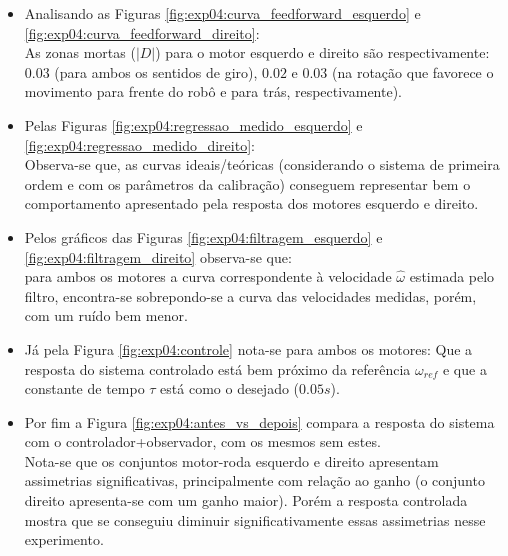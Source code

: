 \begin{itemize}
    \item Analisando as Figuras \ref{fig:exp04:curva_feedforward_esquerdo} e \ref{fig:exp04:curva_feedforward_direito}:\\
        As zonas mortas ($|D|$) para o motor esquerdo e direito são respectivamente: $0.03$ (para ambos os sentidos de giro), $0.02$ e $0.03$ (na rotação que favorece o movimento para frente do robô e para trás, respectivamente).
    \item Pelas Figuras \ref{fig:exp04:regressao_medido_esquerdo} e \ref{fig:exp04:regressao_medido_direito}:\\
        Observa-se que, as curvas ideais/teóricas (considerando o sistema de primeira ordem e com os parâmetros da calibração) conseguem representar bem o comportamento apresentado pela resposta dos motores esquerdo e direito.
    \item Pelos gráficos das Figuras \ref{fig:exp04:filtragem_esquerdo} e \ref{fig:exp04:filtragem_direito} observa-se que:\\
        para ambos os motores a curva correspondente à velocidade $\hat{\omega}$ estimada pelo filtro, encontra-se sobrepondo-se a curva das velocidades medidas, porém, com um ruído bem menor.
    \item Já pela Figura \ref{fig:exp04:controle} nota-se para ambos os motores:
        Que a resposta do sistema controlado está bem próximo da referência $\omega_{ref}$ e que a constante de tempo $\tau$ está como o desejado ($0.05s$).
    \item Por fim a Figura \ref{fig:exp04:antes_vs_depois} compara a resposta do sistema com o controlador+observador, com os mesmos sem estes. \\
        Nota-se que os conjuntos motor-roda esquerdo e direito apresentam assimetrias significativas, principalmente com relação ao  ganho (o conjunto direito apresenta-se com um ganho maior). Porém a resposta controlada mostra que se conseguiu diminuir significativamente essas assimetrias nesse experimento.
\end{itemize}
